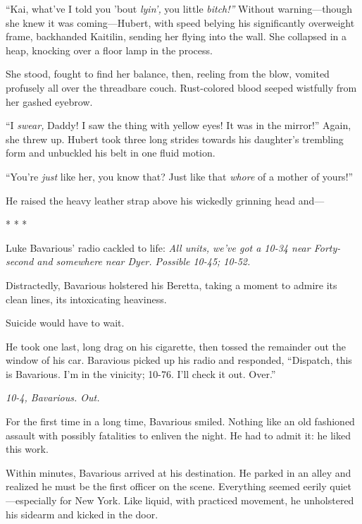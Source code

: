 ``Kai, what've I told you 'bout {\em lyin',} you little
{\em bitch!''} Without warning---though she knew it was
coming---Hubert, with speed belying his significantly
overweight frame, backhanded Kaitilin, sending her flying into the
wall. She collapsed in a heap, knocking over a floor lamp in the
process.



She stood, fought to find her balance, then, reeling from the blow,
vomited profusely all over the threadbare couch. Rust-colored blood
seeped wistfully from her gashed eyebrow.



``I {\em swear,} Daddy! I saw the thing with yellow eyes! It was in
the mirror!'' Again, she threw up. Hubert took three long strides
towards his daughter's trembling form and unbuckled his belt in one
fluid motion.



``You're {\em just} like her, you know that? Just like that
{\em whore} of a mother of yours!''



He raised the heavy leather strap above his wickedly grinning head
and---



* * *



Luke Bavarious' radio cackled to life: {\em All units, we've got a
10-34 near Forty-second and somewhere near Dyer. Possible 10-45;
10-52.}



Distractedly, Bavarious holstered his Beretta, taking a moment to
admire its clean lines, its intoxicating heaviness.



Suicide would have to wait.



He took one last, long drag on his cigarette, then tossed the
remainder out the window of his car. Baravious picked up his radio
and responded, ``Dispatch, this is Bavarious. I'm in the vinicity;
10-76. I'll check it out. Over.''



{\em 10-4, Bavarious. Out.}



For the first time in a long time, Bavarious smiled. Nothing like
an old fashioned assault with possibly fatalities to enliven the
night. He had to admit it: he liked this work.



Within minutes, Bavarious arrived at his destination. He parked in
an alley and realized he must be the first officer on the scene.
Everything seemed eerily quiet---especially for New York. Like
liquid, with practiced movement, he unholstered his sidearm and
kicked in the door.



